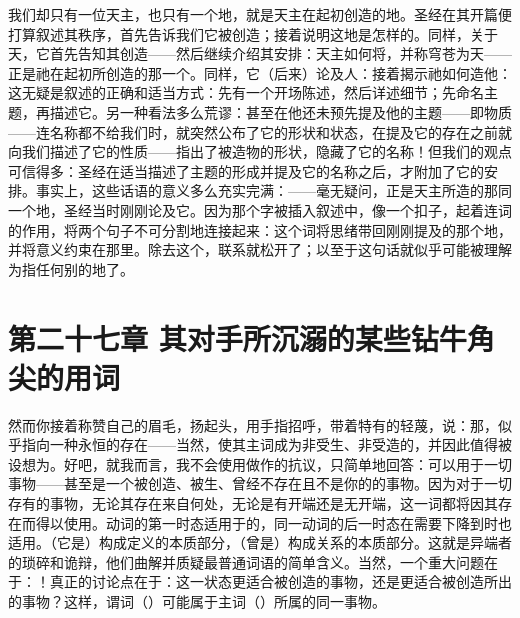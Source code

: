 我们却只有一位天主，也只有一个地，就是天主在起初创造的地。圣经在其开篇便打算叙述其秩序，首先告诉我们它被创造；接着说明这地是怎样的。同样，关于天，它首先告知其创造——然后继续介绍其安排：天主如何将，并称穹苍为天——正是祂在起初所创造的那一个。同样，它（后来）论及人：接着揭示祂如何造他：这无疑是叙述的正确和适当方式：先有一个开场陈述，然后详述细节；先命名主题，再描述它。另一种看法多么荒谬：甚至在他还未预先提及他的主题——即物质——连名称都不给我们时，就突然公布了它的形状和状态，在提及它的存在之前就向我们描述了它的性质——指出了被造物的形状，隐藏了它的名称！但我们的观点可信得多：圣经在适当描述了主题的形成并提及它的名称之后，才附加了它的安排。事实上，这些话语的意义多么充实完满：——毫无疑问，正是天主所造的那同一个地，圣经当时刚刚论及它。因为那个字被插入叙述中，像一个扣子，起着连词的作用，将两个句子不可分割地连接起来：这个词将思绪带回刚刚提及的那个地，并将意义约束在那里。除去这个，联系就松开了；以至于这句话就似乎可能被理解为指任何别的地了。\par


\section{第二十七章 其对手所沉溺的某些钻牛角尖的用词}

然而你接着称赞自己的眉毛，扬起头，用手指招呼，带着特有的轻蔑，说：那，似乎指向一种永恒的存在——当然，使其主词成为非受生、非受造的，并因此值得被设想为。好吧，就我而言，我不会使用做作的抗议，只简单地回答：可以用于一切事物——甚至是一个被创造、被生、曾经不存在且不是你的的事物。因为对于一切存有的事物，无论其存在来自何处，无论是有开端还是无开端，这一词都将因其存在而得以使用。动词的第一时态适用于的，同一动词的后一时态在需要下降到时也适用。（它是）构成定义的本质部分，（曾是）构成关系的本质部分。这就是异端者的琐碎和诡辩，他们曲解并质疑最普通词语的简单含义。当然，一个重大问题在于：！真正的讨论点在于：这一状态更适合被创造的事物，还是更适合被创造所出的事物？这样，谓词（）可能属于主词（）所属的同一事物。\par

